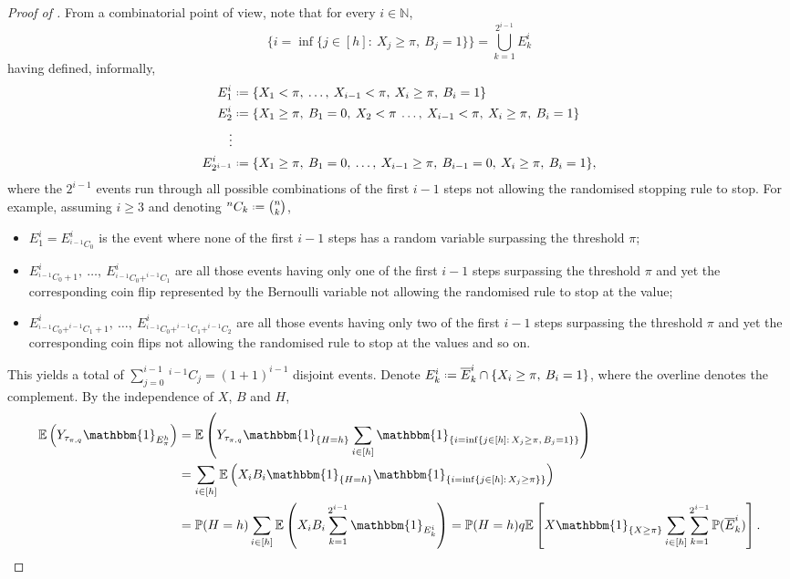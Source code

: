 \documentclass[11pt, a4paper, twoside]{article}
\newcommand*{\defeq}{\mathrel{\vcenter{\baselineskip0.5ex \lineskiplimit0pt
			\hbox{\scriptsize.}\hbox{\scriptsize.}}}=}
\newcommand{\NN}{\mathbb{N}}
\newcommand{\EE}{\mathbb{E}}
\newcommand{\PP}{\mathbb{P}}
\newcommand{\II}{\mathbbm{1}}
\numberwithin{equation}{section}
\begin{document}
\begin{proof}[Proof of ]
		From a combinatorial point of view, note that for every $i\in\NN$,
		\[\{i=\inf\{j\in[h]:\: X_j\ge \pi,\: B_j=1\}\}=\bigcup_{k=1}^{2^{i-1}}E_k^i\]
		having defined, informally, 
		\begin{align*}
			E_1^i&\defeq\{X_1<\pi,\:\ldots,\: X_{i-1}<\pi,\: X_i\ge\pi,\: B_i=1\}\\
			E_2^i&\defeq\{X_1\ge\pi,\: B_1=0,\: X_2<\pi\:\ldots,\: X_{i-1}<\pi,\: X_i\ge\pi,\: B_i=1\}\\
			\vdots&\\
			E_{2^{i-1}}^i&\defeq\{X_1\ge\pi,\: B_1=0,\: \ldots,\: X_{i-1}\ge\pi,\: B_{i-1}=0,\: X_i\ge\pi,\: B_i=1\},
		\end{align*}
		where the $2^{i-1}$ events run through all possible combinations of the first $i-1$ steps not allowing the randomised stopping rule to stop. For example, assuming $i\ge 3$ and denoting $^nC_k\defeq\binom{n}{k}$,
		\begin{itemize}[noitemsep]
			\item $E_1^i=E_{^{i-1}C_0}^i$ is the event where none of the first $i-1$ steps has a random variable surpassing the threshold $\pi$;  
			\item $E_{^{i-1}C_0+1}^i,\: \ldots,\: E_{^{i-1}C_0+^{i-1}C_1}^i$ are all those events having only one of the first $i-1$ steps surpassing the threshold $\pi$ and yet the corresponding coin flip represented by the Bernoulli variable not allowing  the randomised rule to stop at the value;
			\item$E_{^{i-1}C_0+^{i-1}C_1+1}^i,\:\ldots,\: E_{^{i-1}C_0+^{i-1}C_1+^{i-1}C_2}^i$ are all those events having only two of the first $i-1$ steps surpassing the threshold $\pi$ and yet the corresponding coin flips not allowing the randomised rule to stop at the values and so on.
		\end{itemize} 
		This yields a total of $\sum_{j=0}^{i-1}\,^{i-1}C_j=(1+1)^{i-1}$ disjoint events. Denote $E_k^i\defeq\overline{E}_k^i\cap\{X_i\ge\pi,\: B_i=1\}$, where the overline denotes the complement. By the independence of $X$, $B$ and $H$,
		\begin{align*}
			\EE \left(Y_{\tau_{\pi,q}}\II_{E_\pi^h}\right)&=\EE\left( Y_{\tau_{\pi,q}}\II_{\{H=h\}}\sum_{i\in[h]}\II_{\{i=\inf\{j\in[h]:\,X_j\ge \pi,\,B_j=1\}\}}\right)\\&=\sum_{i\in[h]}\EE \left(X_iB_i\II_{\{H=h\}}\II_{\{i=\inf\{j\in[h]:\,X_j\ge \pi\}\}}\right)\\&=\PP(H=h)\sum_{i\in[h]}\EE\left( X_iB_i\sum_{k=1}^{2^{i-1}}\II_{E_k^i}\right)=\PP(H=h)q\EE\left[ X\II_{\{X\ge\pi\}}\sum_{i\in[h]}\sum_{k=1}^{2^{i-1}}\PP(\overline{E}_k^i)\right].

\end{align*}
\end{proof}
\end{document}
